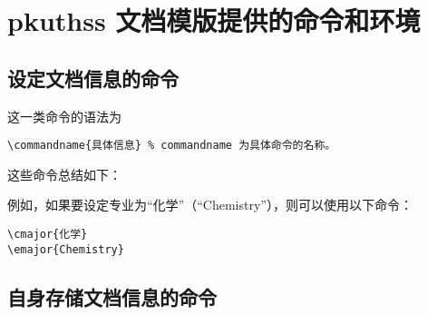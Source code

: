 \section{pkuthss 文档模版提供的命令和环境}
\subsection{设定文档信息的命令}

这一类命令的语法为
\begin{Verbatim}[frame = single]
\commandname{具体信息} % commandname 为具体命令的名称。
\end{Verbatim}

这些命令总结如下：

例如，如果要设定专业为“化学”（“Chemistry”），则可以使用以下命令：
\begin{Verbatim}[frame = single]
\cmajor{化学}
\emajor{Chemistry}
\end{Verbatim}

\subsection{自身存储文档信息的命令}

